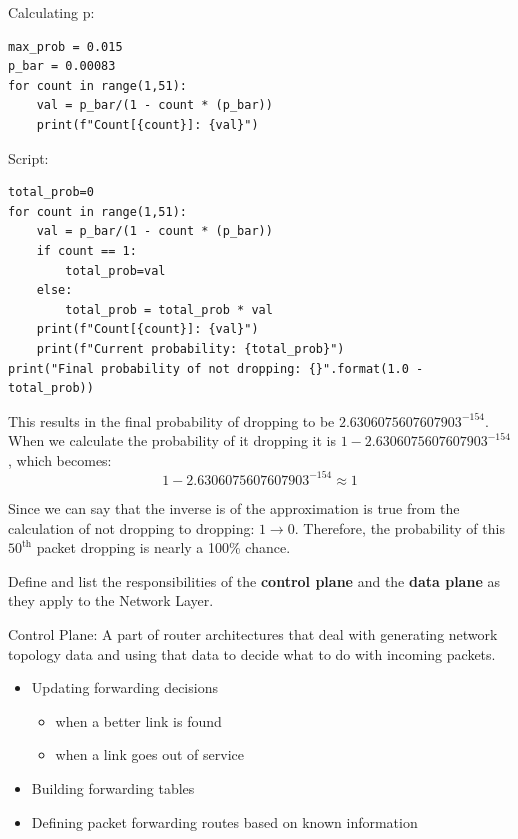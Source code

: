 \documentclass[12pt,addpoints,answers]{exam}
\begin{document}
\begin{questions}
\begin{solution}[3in]
Calculating p:
\begin{lstlisting}
max_prob = 0.015
p_bar = 0.00083
for count in range(1,51):
	val = p_bar/(1 - count * (p_bar))
	print(f"Count[{count}]: {val}")
\end{lstlisting}
    Script:
\begin{lstlisting}
total_prob=0
for count in range(1,51):
	val = p_bar/(1 - count * (p_bar))
	if count == 1:
		total_prob=val
	else:
		total_prob = total_prob * val
	print(f"Count[{count}]: {val}")
	print(f"Current probability: {total_prob}")
print("Final probability of not dropping: {}".format(1.0 - total_prob))
\end{lstlisting}
    This results in the final probability of dropping to be $2.6306075607607903^{-154}$.
When we calculate the probability of it dropping it is $1 - 2.6306075607607903^{-154}$, which becomes:
\begin{equation}
1 - 2.6306075607607903^{-154} \approx 1
\end{equation}

Since we can say that the inverse is of the approximation is true from the calculation of not dropping to dropping: $ 1 \rightarrow 0 $.  Therefore, the probability of this $50^{\mathrm{th}}$ packet dropping is nearly a 100\% chance.
\end{solution}

\question[10] Define and list the responsibilities of the \textbf{control plane} and the \textbf{data plane} as they apply to the Network Layer.
\begin{solution}[3in]
	Control Plane: A part of router architectures that deal with generating network topology data and using that data to decide what to do with incoming packets.
	\begin{itemize}
		\item Updating forwarding decisions
			\begin{itemize}
				\item when a better link is found
				\item when a link goes out of service
			\end{itemize}
		\item Building forwarding tables
		\item Defining packet forwarding routes based on known information
	\end{itemize}
	

\end{solution}
\end{questions}
\end{document}
